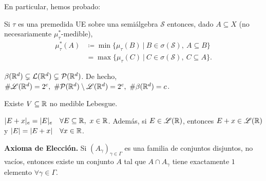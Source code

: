 \medskip
\begin{remark}
	En particular, hemos probado:
\end{remark}
\begin{prop}
	Si $\tau$ es una premedida UE sobre una semiálgebra $\mathscr{S}$ entonces, dado $A \subseteq X$ (no necesariamente $\mu_{\tau}^{*}$-medible),
	\begin{align*}
		\mu_{\tau}^{*}(A) & \coloneq \min \{ \mu_{\tau}(B) \ \big| \ B \in \sigma(\mathscr{S}),\ A \subseteq B \} \\
		& = \max \{ \mu_{\tau}(C) \ \big| \ C \in \sigma(\mathscr{S}),\ C \subseteq A \}  
	.\end{align*}
\end{prop}

\begin{theorem}
	$\beta(\mathbb{R}^d) \subsetneq \mathcal{L}(\mathbb{R}^d) \subsetneq \mathcal{P}(\mathbb{R}^d)$. De hecho, $\# \mathscr{L}(\mathbb{R}^d) = 2^c,\ \# \mathcal{P}(\mathbb{R}^d) \setminus \mathscr{L}(\mathbb{R}^d) = 2^c,\ \# \beta(\mathbb{R}^d) = c$.
\end{theorem}

\begin{theorem}
	Existe $V \subseteq \mathbb{R}$ no medible Lebesgue.
\end{theorem}

\begin{lemma}
	$|E + x|_{e} = |E|_{e} \quad \forall E \subseteq \mathbb{R},\ x \in \mathbb{R}$. Además, si $E \in \mathscr{L}(\mathbb{R})$, entonces $E+x \in \mathscr{L}(\mathbb{R})$ y $|E| = |E + x| \quad \forall x \in \mathbb{R}$.
\end{lemma}
\medskip
\noindent \textbf{Axioma de Elección.} Si $(A_{\gamma})_{\gamma\in\Gamma}$ es una familia de conjuntos disjuntos, no vacíos, entonces existe un conjunto $A$ tal que $A \cap A_{\gamma}$ tiene exactamente $1$ elemento $\forall \gamma \in \Gamma$.


